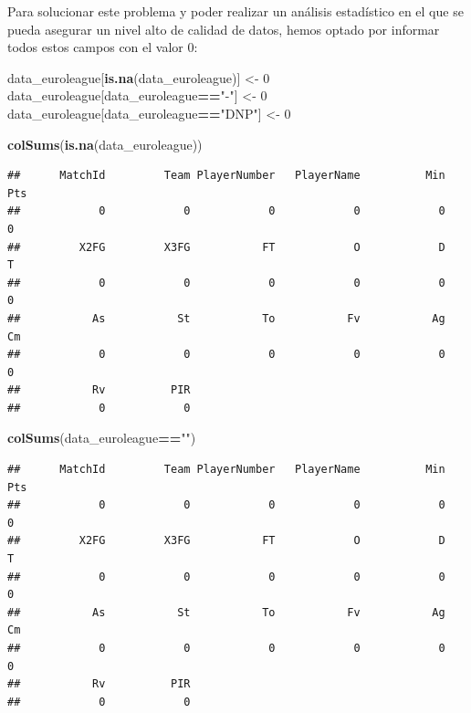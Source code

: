 \documentclass[
]{article}
\newenvironment{Shaded}{\begin{snugshade}}{\end{snugshade}}
\newcommand{\DecValTok}[1]{\textcolor[rgb]{0.00,0.00,0.81}{#1}}
\newcommand{\KeywordTok}[1]{\textcolor[rgb]{0.13,0.29,0.53}{\textbf{#1}}}
\newcommand{\NormalTok}[1]{#1}
\newcommand{\OperatorTok}[1]{\textcolor[rgb]{0.81,0.36,0.00}{\textbf{#1}}}
\newcommand{\StringTok}[1]{\textcolor[rgb]{0.31,0.60,0.02}{#1}}
\begin{document}
\newpage

Para solucionar este problema y poder realizar un análisis estadístico
en el que se pueda asegurar un nivel alto de calidad de datos, hemos
optado por informar todos estos campos con el valor 0:

\begin{Shaded}
\begin{Highlighting}[]
\NormalTok{data_euroleague[}\KeywordTok{is.na}\NormalTok{(data_euroleague)] <-}\StringTok{ }\DecValTok{0}
\NormalTok{data_euroleague[data_euroleague}\OperatorTok{==}\StringTok{"-"}\NormalTok{] <-}\StringTok{ }\DecValTok{0}
\NormalTok{data_euroleague[data_euroleague}\OperatorTok{==}\StringTok{"DNP"}\NormalTok{] <-}\StringTok{ }\DecValTok{0}

\KeywordTok{colSums}\NormalTok{(}\KeywordTok{is.na}\NormalTok{(data_euroleague))}
\end{Highlighting}
\end{Shaded}

\begin{verbatim}
##      MatchId         Team PlayerNumber   PlayerName          Min          Pts 
##            0            0            0            0            0            0 
##         X2FG         X3FG           FT            O            D            T 
##            0            0            0            0            0            0 
##           As           St           To           Fv           Ag           Cm 
##            0            0            0            0            0            0 
##           Rv          PIR 
##            0            0
\end{verbatim}

\begin{Shaded}
\begin{Highlighting}[]
\KeywordTok{colSums}\NormalTok{(data_euroleague}\OperatorTok{==}\StringTok{""}\NormalTok{)}
\end{Highlighting}
\end{Shaded}

\begin{verbatim}
##      MatchId         Team PlayerNumber   PlayerName          Min          Pts 
##            0            0            0            0            0            0 
##         X2FG         X3FG           FT            O            D            T 
##            0            0            0            0            0            0 
##           As           St           To           Fv           Ag           Cm 
##            0            0            0            0            0            0 
##           Rv          PIR 
##            0            0
\end{verbatim}
\end{document}

